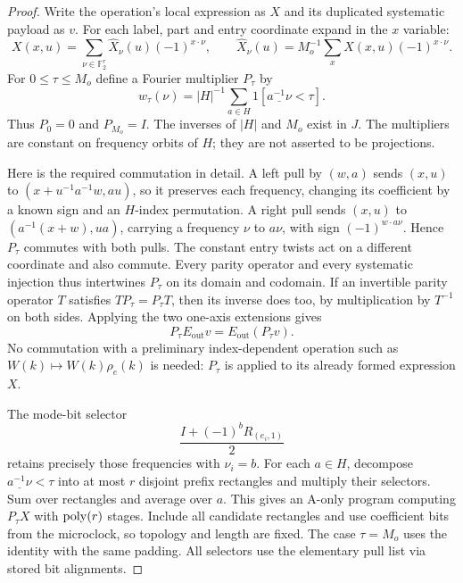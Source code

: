 \begin{proof}
Write the operation's local expression as $X$ and its duplicated
systematic payload as $v$.  For each label, part and entry coordinate
expand in the $x$ variable:
\[
 X(x,u)=\sum_{\nu\in\mathbb F_2^r}\widehat X_\nu(u)(-1)^{x\cdot\nu},
 \qquad
 \widehat X_\nu(u)=M_o^{-1}\sum_xX(x,u)(-1)^{x\cdot\nu}.
\]
For $0\le\tau\le M_o$ define a Fourier multiplier $P_\tau$ by
\begin{equation}\label{op:cutoff}
 w_\tau(\nu)=|H|^{-1}\sum_{a\in H}
                    1[\underline{a^{-1}\nu}<\tau].
\end{equation}
Thus $P_0=0$ and $P_{M_o}=I$.  The inverses of $|H|$ and $M_o$
exist in $J$.  The multipliers are constant on frequency orbits of
$H$; they are not asserted to be projections.

Here is the required commutation in detail.  A left pull by $(w,a)$
sends $(x,u)$ to $(x+u^{-1}a^{-1}w,au)$, so it preserves each
frequency, changing its coefficient by a known sign and an $H$-index
permutation.  A right pull sends $(x,u)$ to
$(a^{-1}(x+w),ua)$, carrying a frequency $\nu$ to $a\nu$, with
sign $(-1)^{w\cdot a\nu}$.  Hence $P_\tau$ commutes with both pulls.
The constant entry twists act on a different coordinate and also
commute.  Every parity operator and every systematic injection thus
intertwines $P_\tau$ on its domain and codomain.  If an invertible
parity operator $T$ satisfies $TP_\tau=P_\tau T$, then its inverse
does too, by multiplication by $T^{-1}$ on both sides.  Applying the
two one-axis extensions gives
\begin{equation}\label{op:cutoff-extension}
              P_\tau E_{\mathrm{out}}v
                      =E_{\mathrm{out}}(P_\tau v).
\end{equation}
No commutation with a preliminary index-dependent operation such as
$W(k)\mapsto W(k)\rho_e(k)$ is needed: $P_\tau$ is applied to its
already formed expression $X$.

The mode-bit selector
\begin{equation}\label{op:mode-selector}
                   \frac{I+(-1)^bR_{(e_i,1)}}2
\end{equation}
retains precisely those frequencies with $\nu_i=b$.
For each $a\in H$, decompose
$\underline{a^{-1}\nu}<\tau$ into at most $r$ disjoint prefix
rectangles and multiply their selectors.  Sum over rectangles and
average over $a$.  This gives an A-only program computing $P_\tau X$
with $\operatorname{poly}(r)$ stages.  Include all candidate rectangles and use
coefficient bits from the microclock, so topology and length are fixed.
The case $\tau=M_o$ uses the identity with the same padding.
All selectors use the elementary pull list via stored bit alignments.


\end{proof}

